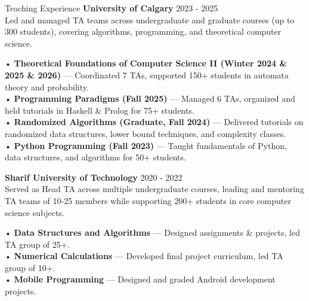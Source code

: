 \documentclass{resume} %
\begin{document}
\begin{rSection}{Teaching Experience}
\textbf{University of Calgary} \hfill 2023 - 2025 \\
Led and managed TA teams across undergraduate and graduate courses (up to 300 students), covering algorithms, programming, and theoretical computer science.

\noindent
• \textbf{Theoretical Foundations of Computer Science II (Winter 2024 \& 2025 \& 2026)} — Coordinated 7 TAs, supported 150+ students in automata theory and probability.\\
• \textbf{Programming Paradigms (Fall 2025)} — Managed 6 TAs, organized and held tutorials in Haskell \& Prolog for 75+ students.\\
• \textbf{Randomized Algorithms (Graduate, Fall 2024)} — Delivered tutorials on randomized data structures, lower bound techniques, and complexity classes.\\
• \textbf{Python Programming (Fall 2023)} — Taught fundamentals of Python, data structures, and algorithms for 50+ students.

\textbf{Sharif University of Technology} \hfill 2020 - 2022 \\
Served as Head TA across multiple undergraduate courses, leading and mentoring TA teams of 10-25 members while supporting 200+ students in core computer science subjects.

\noindent
• \textbf{Data Structures and Algorithms} — Designed assignments \& projects, led TA group of 25+.\\
• \textbf{Numerical Calculations} — Developed final project curriculum, led TA group of 10+.\\
• \textbf{Mobile Programming} — Designed and graded Android development projects.

\end{rSection}

\end{document}
